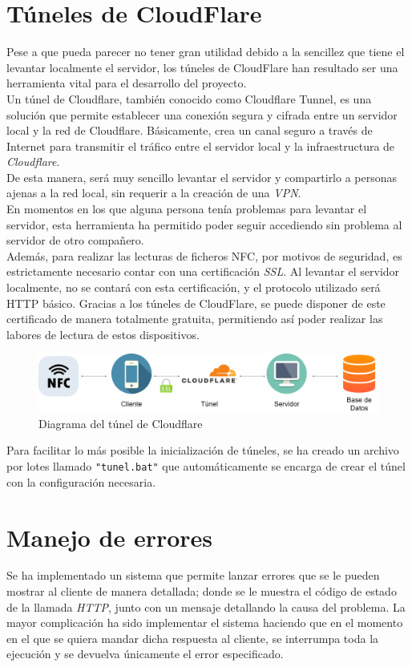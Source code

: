 \documentclass[12pt]{report}
\begin{document}
\section{Túneles de CloudFlare}
Pese a que pueda parecer no tener gran utilidad debido a la sencillez que tiene el levantar localmente el servidor, los túneles de CloudFlare han resultado ser una herramienta vital para el desarrollo del proyecto.\\
Un túnel de Cloudflare, también conocido como Cloudflare Tunnel, es una solución que permite establecer una conexión segura y cifrada entre un servidor local y la red de Cloudflare. Básicamente, crea un canal seguro a través de Internet para transmitir el tráfico entre el servidor local y la infraestructura de \textit{Cloudflare}.\\
De esta manera, será muy sencillo levantar el servidor y compartirlo a personas ajenas a la red local, sin requerir a la creación de una \textit{VPN}.\\

En momentos en los que alguna persona tenía problemas para levantar el servidor, esta herramienta ha permitido poder seguir accediendo sin problema al servidor de otro compañero.\\

Además, para realizar las lecturas de ficheros NFC, por motivos de seguridad, es estrictamente necesario contar con una certificación \textit{SSL}. Al levantar el servidor localmente, no se contará con esta certificación, y el protocolo utilizado será HTTP básico. Gracias a los túneles de CloudFlare, se puede disponer de este certificado de manera totalmente gratuita, permitiendo así poder realizar las labores de lectura de estos dispositivos.

\begin{figure}[H]
    \centering
    \includegraphics[width=0.75\linewidth]{imagenes//diagramas/diagrama_cloudflare.png}
    \caption{Diagrama del túnel de Cloudflare}
    \label{fig:enter-label}
\end{figure}
Para facilitar lo más posible la inicialización de túneles, se ha creado un archivo por lotes llamado \texttt{"tunel.bat"} que automáticamente se encarga de crear el túnel con la configuración necesaria.
\section{Manejo de errores}
Se ha implementado un sistema que permite lanzar errores que se le pueden mostrar al cliente de manera detallada; donde se le muestra el código de estado de la llamada \textit{HTTP}, junto con un mensaje detallando la causa del problema. La mayor complicación ha sido implementar el sistema haciendo que en el momento en el que se quiera mandar dicha respuesta al cliente, se interrumpa toda la ejecución y se devuelva únicamente el error especificado.
\end{document}
